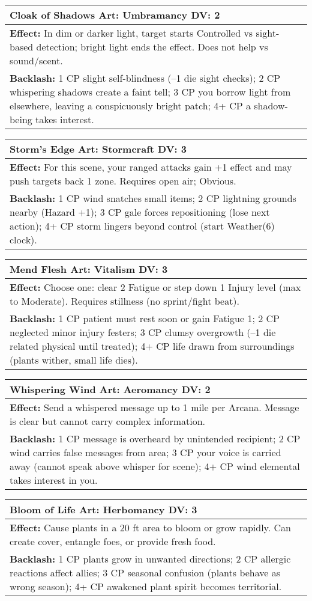 \documentclass[11pt]{report}
\newenvironment{spellentry}[3]{%
  \begin{center}
    \begin{tabular}{|p{5.5in}|}
      \hline
      \textbf{#1} \hfill \textbf{Art:} #2 \hfill \textbf{DV:} #3 \\
      \hline
}{%
      \hline
    \end{tabular}
  \end{center}
}
\begin{document}
\begin{spellentry}{Cloak of Shadows}{Umbramancy}{2}
\textbf{Effect:} In dim or darker light, target starts Controlled vs sight-based detection; bright light ends the effect. Does not help vs sound/scent.\\
\textbf{Backlash:} 1 CP slight self-blindness (–1 die sight checks); 2 CP whispering shadows create a faint tell; 3 CP you borrow light from elsewhere, leaving a conspicuously bright patch; 4+ CP a shadow-being takes interest.
\end{spellentry}

\begin{spellentry}{Storm's Edge}{Stormcraft}{3}
\textbf{Effect:} For this scene, your ranged attacks gain +1 effect and may push targets back 1 zone. Requires open air; Obvious.\\
\textbf{Backlash:} 1 CP wind snatches small items; 2 CP lightning grounds nearby (Hazard +1); 3 CP gale forces repositioning (lose next action); 4+ CP storm lingers beyond control (start Weather(6) clock).
\end{spellentry}

\begin{spellentry}{Mend Flesh}{Vitalism}{3}
\textbf{Effect:} Choose one: clear 2 Fatigue or step down 1 Injury level (max to Moderate). Requires stillness (no sprint/fight beat).\\
\textbf{Backlash:} 1 CP patient must rest soon or gain Fatigue 1; 2 CP neglected minor injury festers; 3 CP clumsy overgrowth (–1 die related physical until treated); 4+ CP life drawn from surroundings (plants wither, small life dies).
\end{spellentry}

\begin{spellentry}{Whispering Wind}{Aeromancy}{2}
\textbf{Effect:} Send a whispered message up to 1 mile per Arcana. Message is clear but cannot carry complex information.\\
\textbf{Backlash:} 1 CP message is overheard by unintended recipient; 2 CP wind carries false messages from area; 3 CP your voice is carried away (cannot speak above whisper for scene); 4+ CP wind elemental takes interest in you.
\end{spellentry}

\begin{spellentry}{Bloom of Life}{Herbomancy}{3}
\textbf{Effect:} Cause plants in a 20 ft area to bloom or grow rapidly. Can create cover, entangle foes, or provide fresh food.\\
\textbf{Backlash:} 1 CP plants grow in unwanted directions; 2 CP allergic reactions affect allies; 3 CP seasonal confusion (plants behave as wrong season); 4+ CP awakened plant spirit becomes territorial.
\end{spellentry}
\end{document}
